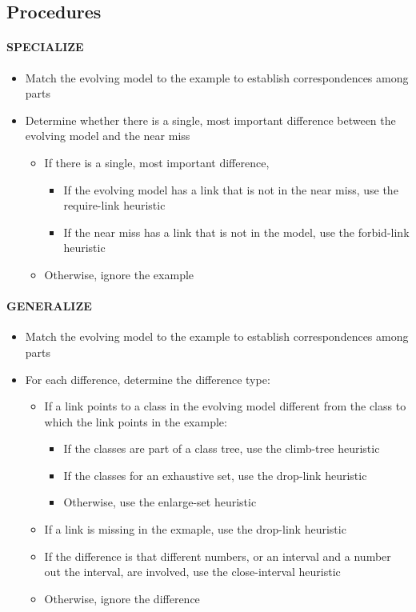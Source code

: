 \subsection{Procedures}

\paragraph{SPECIALIZE}
\begin{itemize}
  \item Match the evolving model to the example to establish
    correspondences among parts
  \item Determine whether there is a single, most important
    difference between the evolving model and the near miss
  \begin{itemize}
    \item If there is a single, most important difference,
      \begin{itemize}
        \item If the evolving model has a link that is not in the
          near miss, use the require-link heuristic
        \item If the near miss has a link that is not in the model,
          use the forbid-link heuristic
      \end{itemize}
    \item Otherwise, ignore the example
  \end{itemize}
\end{itemize}

\paragraph{GENERALIZE}
\begin{itemize}
  \item Match the evolving model to the example to establish
    correspondences among parts
  \item For each difference, determine the difference type:
    \begin{itemize}
      \item If a link points to a class in the evolving model
        different from the class to which the link points in the
        example:
        \begin{itemize}
          \item If the classes are part of a class tree, use the
            climb-tree heuristic
          \item If the classes for an exhaustive set, use the
            drop-link heuristic
          \item Otherwise, use the enlarge-set heuristic
        \end{itemize}
      \item If a link is missing in the exmaple, use the drop-link
        heuristic
      \item If the difference is that different numbers, or an
        interval and a number out the interval, are involved, use
        the close-interval heuristic
      \item Otherwise, ignore the difference
    \end{itemize}
\end{itemize}

